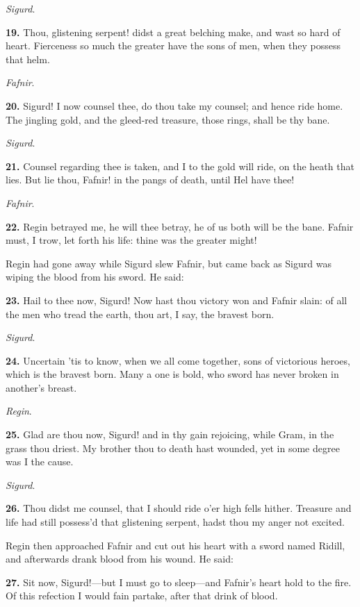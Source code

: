 \emph{Sigurd}.

\textbf{19.} Thou, glistening serpent! didst a great belching make, and wast
so hard of heart. Fierceness so much the greater have the sons of men,
when they possess that helm.

\emph{Fafnir}.

\textbf{20.} Sigurd! I now counsel thee, do thou take my counsel; and hence
ride home. The jingling gold, and the gleed-red treasure, those rings,
shall be thy bane.

\emph{Sigurd}.

\textbf{21.} Counsel regarding thee is taken, and I to the gold will ride, on
the heath that lies. But lie thou, Fafnir! in the pangs of death,
until Hel have thee!

\emph{Fafnir}.

\textbf{22.} Regin betrayed me, he will thee betray, he of us both will be
the bane. Fafnir must, I trow, let forth his life: thine was the
greater might!

Regin had gone away while Sigurd slew Fafnir, but came back as Sigurd
was wiping the blood from his sword. He said:

\textbf{23.} Hail to thee now, Sigurd! Now hast thou victory won and Fafnir
slain: of all the men who tread the earth, thou art, I say, the
bravest born.

\emph{Sigurd}.

\textbf{24.} Uncertain 'tis to know, when we all come together, sons of
victorious heroes, which is the bravest born. Many a one is bold, who
sword has never broken in another's breast.

\emph{Regin}.

\textbf{25.} Glad are thou now, Sigurd! and in thy gain rejoicing, while
Gram, in the grass thou driest. My brother thou to death hast wounded,
yet in some degree was I the cause.

\emph{Sigurd}.

\textbf{26.} Thou didst me counsel, that I should ride o'er high fells
hither. Treasure and life had still possess'd that glistening serpent,
hadst thou my anger not excited.

Regin then approached Fafnir and cut out his heart with a sword named
Ridill, and afterwards drank blood from his wound. He said:

\textbf{27.} Sit now, Sigurd!—but I must go to sleep—and Fafnir's heart
hold to the fire. Of this refection I would fain partake, after that
drink of blood.

